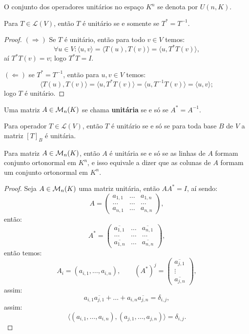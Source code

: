 \documentclass[11pt,twoside,a4paper]{book}
\begin{document}
\begin{definicao}
O conjunto dos operadores unitários no espaço $K^n$ se denota por $U(n,K)$.
\end{definicao}

\begin{teorema}
Para $T\in\mathcal{L}(V)$, então $T$ é unitário se e somente se $T^*=T^{-1}$.
\end{teorema}
\begin{proof}
$(\Rightarrow)$ Se $T$ é unitário, então para todo $v\in V$ temos:
\[
\forall u\in V: \langle u,v\rangle=\langle T(u),T(v)\rangle=\langle u,T^*T(v)\rangle,
\]
aí $T^*T(v)=v$; logo $T^*T=I$.

\medskip
\noindent
$(\Leftarrow)$ se $T^*=T^{-1}$, então para $u,v\in V$ temos:
\[
\langle T(u),T(v)\rangle=\langle u,T^*T(v)\rangle=\langle u,T^{-1}T(v)\rangle=\langle u,v\rangle;
\]
logo $T$ é unitário.
\end{proof}

\begin{definicao}
Uma matriz $A\in\mathcal{M}_{n}(K)$ se chama \textbf{unitária} se e só se $A^*=A^{-1}$. 
\end{definicao}

\begin{corolario}
Para operador $T\in\mathcal{L}(V)$, então $T$ é unitário se e só se para toda base $B$ de $V$ a matriz $[T]_B$ é unitária.
\end{corolario}

\begin{teorema}
Para matriz $A\in\mathcal{M}_{n}(K)$, então $A$ é unitária se e só se as linhas de $A$ formam conjunto ortonormal em $K^n$, e isso equivale a dizer que as colunas de $A$ formam um conjunto ortonormal em $K^n$.
\end{teorema}
\begin{proof}
Seja $A\in\mathcal{M}_{n}(K)$ uma matriz unitária, então $AA^*=I$, aí sendo:
\[
A=\begin{pmatrix}
a_{1,1}&\dots&a_{1,n}\\\dots&\dots&\dots\\a_{n,1}&\dots&a_{n,n}
\end{pmatrix},
\]
então:
\[
A^*=\begin{pmatrix}
\overline{a_{1,1}}&\dots&\overline{a_{n,1}}\\\dots&\dots&\dots\\\overline{a_{1,n}}&\dots&\overline{a_{n,n}}
\end{pmatrix},
\]
então temos:
\[
A_i=(a_{i,1},\dots,a_{i,n}),\quad\quad(A^*)^j=\begin{pmatrix}
\overline{a_{j,1}}\\\vdots\\\overline{a_{j,n}}
\end{pmatrix},
\]
assim:
\[
a_{i,1}\overline{a_{j,1}}+\dots+a_{i,n}\overline{a_{j,n}}=\delta_{i,j},
\]
assim:
\[
\langle(a_{i,1},\dots,a_{i,n}),(a_{j,1},\dots,a_{j,n})\rangle=\delta_{i,j}.
\]
\end{proof}
\end{document}
